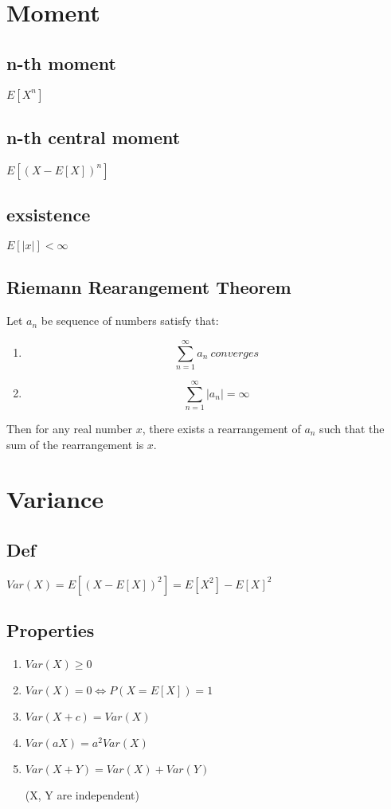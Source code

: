\section{Moment}
    \subsection*{n-th moment}
        $E[X^n]$
    \subsection*{n-th central moment}
        $E[(X-E[X])^n]$

    \subsection*{exsistence}
        $E[|x|] < \infty$

    \subsection*{Riemann Rearangement Theorem}
        Let ${a_n}$ be sequence of numbers satisfy that:
        \begin{enumerate}
            \item \[\sum_{n=1}^{\infty} a_n\ converges\] 
            \item \[\sum_{n=1}^{\infty} |a_n|=\infty\] 
        \end{enumerate}

        Then for any real number $x$, there exists a rearrangement of ${a_n}$
        such that the sum of the rearrangement is $x$.

\section{Variance}
    \subsection*{Def}
        $Var(X)=E[(X-E[X])^2]=E[X^2]-E[X]^2$

    \subsection*{Properties}
        \begin{enumerate}
            \item $Var(X) \geq 0$
            \item $Var(X) = 0 \iff P(X=E[X]) = 1$
            \item $Var(X+c) = Var(X)$
            \item $Var(aX)=a^2Var(X)$
            \item $Var(X+Y) = Var(X) + Var(Y)$
            
            (X, Y are independent)
        \end{enumerate}


